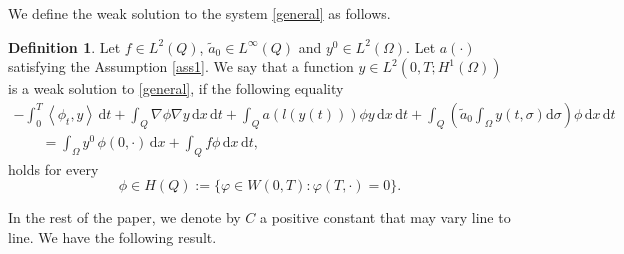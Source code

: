 \documentclass[reqno,twoside]{amsart}
\numberwithin{equation}{section}
\newtheorem{theorem}{Theorem}[section]
\theoremstyle{definition}
\newtheorem{definition}[theorem]{Definition}
\numberwithin{equation}{section}
\def \dis {\displaystyle}
\def \C {\mathcal{C}}
\def \C {{\mathcal C}}
\def \dx{\mathrm{d}x}
\def \dt{\mathrm{d}t}
\def \dq {\mathrm{d}x \, \mathrm{d}t}
\def \d {\mathrm{d}}
\def \C {\mathcal{C}}
\def \C {{\mathcal C}}
\begin{document}
We define the weak solution to the system \eqref{general} as follows.
\begin{definition}\label{weakgen}
	Let $f\in L^2(Q)$, $\tilde{a}_0\in L^\infty(Q)$ and $y^{0}\in L^2(\Omega)$. Let $a(\cdot)$  satisfying the Assumption \ref{ass1}.  We  say that a function
	$y\in L^2(0,T;H^1(\Omega))$ is a weak solution to \eqref{general}, if the following equality
	\begin{equation}\label{weakgene}
		\begin{array}{lll}
			\dis -\int_{0}^{T} \left\langle \phi_t,y\right\rangle \, \dt+ \int_Q \nabla \phi\nabla y\, \dq+\int_Q a\left(l(y(t))\right) \phi y\, \dq+\int_Q\left(\tilde{a}_0 \dis \int_{\Omega}y(t,\sigma)\d\sigma\right)\phi\, \dq\\
			\qquad =
			\dis \int_\Omega y^0\,\phi(0,\cdot)\, \dx+\int_{Q}f\phi\,\dq ,
		\end{array}
	\end{equation}
	holds for every
	\begin{equation}\label{defH}
		\phi \in H(Q):=\{\varphi\in W(0,T): \varphi(T,\cdot)=0\}.
	\end{equation}
\end{definition}
In the rest of the paper, we denote by $C$ a positive constant that may vary line to line.
We have the following result.
%
\end{document}
